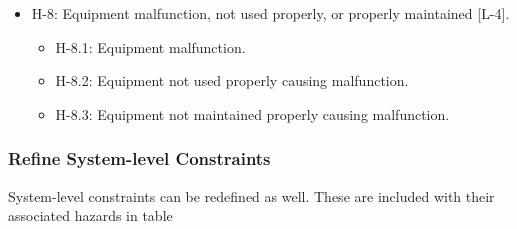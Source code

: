 \documentclass[../../main/main.tex]{subfiles}
\begin{document}
\begin{itemize}
\item H-8: Equipment malfunction, not used properly, or properly maintained [L-4].\\
\begin{itemize}
\item H-8.1: Equipment malfunction.
\item H-8.2: Equipment not used properly causing malfunction.
\item H-8.3: Equipment not maintained properly causing malfunction.
\end{itemize}


\end{itemize}

\subsubsection{Refine System-level Constraints}
System-level constraints can be redefined as well.  These are included with their associated hazards in table

\parskip=8pt
\end{document}
